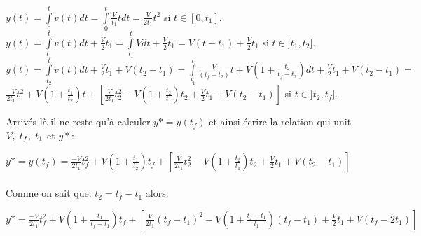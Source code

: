 	\begin{center}
		$ y(t) = \overset{t}{\underset{0}{\int}}v(t)dt = \overset{t}{\underset{0}{\int}}\frac{V}{t_1}tdt = \frac{V}{2t_1} t^2 $ \hspace{1 cm} si $t \in [0, t_1].$\\[0.25 cm]
		
		$ y(t) = \overset{t}{\underset{t_1}{\int}}v(t)dt + \frac{V}{2} t_1 = \overset{t}{\underset{t_1}{\int}}V dt + \frac{V}{2} t_1 = V (t-t_1) + \frac{V}{2} t_1$ \hspace{1 cm} si $t \in ]t_1, t_2].$\\[0.25 cm]
		
		$ y(t) = \overset{t}{\underset{t_2}{\int}}v(t)dt + \frac{V}{2} t_1 + V (t_2-t_1) = \overset{t}{\underset{t_1}{\int}} \frac{V}{(t_f-t_2)}t + V(1+\frac{t_2}{t_f-t_2}) dt + \frac{V}{2} t_1 + V (t_2-t_1) =$\\[0.25 cm] $ \frac{-V}{2t_1}t^2 + V (1+\frac{t_1}{t_2})t + [\frac{V}{2t_1}t^{2}_2 - V(1+\frac{t_2}{t_1})t_2 + \frac{V}{2} t_1 + V (t_2-t_1)]$ \hspace{1 cm} si $t \in ]t_2, t_f].$			
			 
	\end{center} 
	 \par Arrivés là il ne reste qu'à calculer $y*=y(t_f)$ et ainsi écrire la relation qui unit $V,\hspace{1 mm} t_f, \hspace{ 1 mm} t_1$ et $y*$:
	 
	 \begin{center}
	 	
		$y* = y(t_f) = \frac{-V}{2t_1}t^2_f + V (1+\frac{t_1}{t_2})t_f + [\frac{V}{2t_1}t^{2}_2 - V(1+\frac{t_2}{t_1})t_2 + \frac{V}{2} t_1 + V (t_2-t_1)]$	 	
	 \end{center} 
	 
	  \paragraph{} Comme on sait que: $t_2 = t_f-t_1$ alors: \\
	  
		 \begin{center}
			
				$y* = \frac{-V}{2t_1}t^2_f + V (1+\frac{t_1}{t_f-t_1})t_f + [\frac{V}{2t_1}(t_f-t_1)^2 - V(1+\frac{t_f-t_1}{t_1})(t_f-t_1) + \frac{V}{2} t_1 + V (t_f-2t_1)]$		
			 
		\end{center}		  
	  

